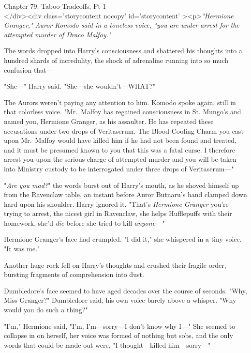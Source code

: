 
Chapter 79: Taboo Tradeoffs, Pt 1\\
</div><div  class='storycontent nocopy' id='storycontent' ><p>\emph{"Hermione Granger," Auror Komodo said in a toneless voice, "you are under arrest for the attempted murder of Draco Malfoy."}

The words dropped into Harry's consciousness and shattered his thoughts into a hundred shards of incredulity, the shock of adrenaline running into so much confusion that---

"She---" Harry said. "She---she wouldn't---WHAT?"

The Aurors weren't paying any attention to him. Komodo spoke again, still in that colorless voice. "Mr.~Malfoy has regained consciousness in St. Mungo's and named you, Hermione Granger, as his assaulter. He has repeated these accusations under two drops of Veritaserum. The Blood-Cooling Charm you cast upon Mr.~Malfoy would have killed him if he had not been found and treated, and it must be presumed known to you that this was a fatal curse. I therefore arrest you upon the serious charge of attempted murder and you will be taken into Ministry custody to be interrogated under three drops of Veritaserum---"

"\emph{Are you mad?}" the words burst out of Harry's mouth, as he shoved himself up from the Ravenclaw table, an instant before Auror Butnaru's hand clamped down hard upon his shoulder. Harry ignored it. "That's \emph{Hermione Granger} you're trying to arrest, the nicest girl in Ravenclaw, she helps Hufflepuffs with their homework, she'd \emph{die} before she tried to kill \emph{anyone---}"

Hermione Granger's face had crumpled. "I did it," she whispered in a tiny voice. "It was me."

Another huge rock fell on Harry's thoughts and crushed their fragile order, bursting fragments of comprehension into dust.

Dumbledore's face seemed to have aged decades over the course of seconds. "Why, Miss Granger?" Dumbledore said, his own voice barely above a whisper. "Why would you do such a thing?"

"I'm," Hermione said, "I'm, I'm---sorry---I don't know why I---" She seemed to collapse in on herself, her voice was formed of nothing but sobs, and the only words that could be made out were, "I thought---killed him---sorry---"

